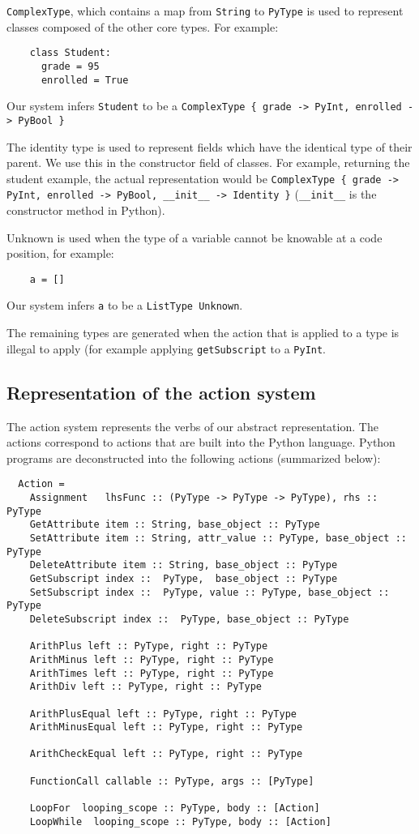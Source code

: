 \documentclass{article}[12pt]
\begin{document}
\verb=ComplexType=, which contains a map from \verb=String= to \verb=PyType= is used to represent
classes composed of the other core types. For example:
\begin{verbatim}
    class Student:
      grade = 95 
      enrolled = True
\end{verbatim}

Our system infers \verb=Student= to be a 
\verb=ComplexType { grade -> PyInt, enrolled -> PyBool }=

The identity type is used to represent fields which have the identical type of their parent. We use
this in the constructor field of classes. For example, returning the student example, the actual
representation would be
\verb=ComplexType { grade -> PyInt, enrolled -> PyBool, __init__ -> Identity }=
(\verb=__init__= is the constructor method in Python).

Unknown is used when the type of a variable cannot be knowable at a code position, for example:
\begin{verbatim}
    a = []
\end{verbatim}
Our system infers \verb=a= to be a \verb=ListType Unknown=.

The remaining types are generated when the action that is applied to a type is illegal to apply (for
example applying \verb=getSubscript= to a \verb=PyInt=.

\subsection{Representation of the action system}
The action system represents the verbs of our abstract representation. The actions correspond to
actions that are built into the Python language. Python programs are
deconstructed into the following actions (summarized below):
\begin{verbatim}
  Action =
    Assignment   lhsFunc :: (PyType -> PyType -> PyType), rhs :: PyType
    GetAttribute item :: String, base_object :: PyType 
    SetAttribute item :: String, attr_value :: PyType, base_object :: PyType 
    DeleteAttribute item :: String, base_object :: PyType
    GetSubscript index ::  PyType,  base_object :: PyType 
    SetSubscript index ::  PyType, value :: PyType, base_object :: PyType 
    DeleteSubscript index ::  PyType, base_object :: PyType 

    ArithPlus left :: PyType, right :: PyType 
    ArithMinus left :: PyType, right :: PyType 
    ArithTimes left :: PyType, right :: PyType
    ArithDiv left :: PyType, right :: PyType 

    ArithPlusEqual left :: PyType, right :: PyType
    ArithMinusEqual left :: PyType, right :: PyType

    ArithCheckEqual left :: PyType, right :: PyType

    FunctionCall callable :: PyType, args :: [PyType]

    LoopFor  looping_scope :: PyType, body :: [Action]
    LoopWhile  looping_scope :: PyType, body :: [Action]
\end{verbatim}
\end{document}
